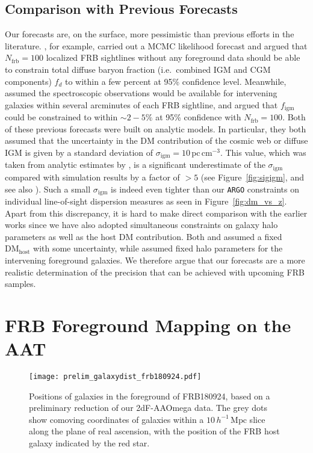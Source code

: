 \documentclass[twocolumn]{aastex63}
\newcommand{\dmhost}{\ensuremath{\mathrm{DM}_\mathrm{host}}}
\newcommand{\pccmcube}{\ensuremath{\mathrm{pc}\,\mathrm{cm}^{-3}}}
\newcommand{\sigigm}{\ensuremath{\sigma_\mathrm{igm}}}
\newcommand{\figm}{\ensuremath{f_\mathrm{igm}}}
\newcommand{\hmpc}{\ensuremath{h^{-1}\,\mathrm{Mpc}}}
\newcommand{\nfrb}{\ensuremath{N_\mathrm{frb}}}
\newcommand{\argo}{\texttt{ARGO}}
\begin{document}
\begin{CJK*}{UTF8}{gbsn}
\subsection{Comparison with Previous Forecasts}
Our forecasts are, on the surface, more pessimistic than previous efforts in the literature. \citet{walters:2019}, for example, carried out a MCMC likelihood
forecast and argued that  $\nfrb=100$ localized FRB sightlines without any foreground data should be able to constrain total diffuse
baryon fraction (i.e.\ combined IGM and CGM components) $f_d$ to within a few percent 
at 95\% confidence level. Meanwhile, \citet{ravi:2019} assumed the spectroscopic observations would be available for intervening galaxies within
several arcminutes of each FRB sightline, and argued that \figm{} could be constrained to within $\sim 2-5\%$ at 95\% confidence with $\nfrb=100$.
Both of these previous forecasts were built on analytic models. In particular, they both assumed that the uncertainty in the DM contribution of the cosmic web
or diffuse IGM is given by a standard deviation of $\sigigm=10\,\pccmcube$. 
{This value, which was taken from analytic estimates by \cite{shull:2018}},
is a significant underestimate of the \sigigm{} compared with simulation results by a factor of $>5$ (see
 Figure~\ref{fig:sigigm}, and see also \citealt{batten:2021}).
 Such a small $\sigigm$ is indeed even tighter than our \argo{} constraints
on individual line-of-sight dispersion measures as seen in Figure~\ref{fig:dm_vs_z}. 
Apart from this discrepancy, it is hard to make direct comparison with the earlier works since we have also adopted simultaneous constraints on galaxy halo parameters
as well as the host DM contribution. Both \citet{walters:2019} and \citet{ravi:2019} assumed a fixed \dmhost{} with some uncertainty, while \citet{ravi:2019}
assumed fixed halo parameters for the intervening foreground galaxies. We therefore argue that our forecasts are a more realistic determination of the precision
that can be achieved with upcoming FRB samples.

\section{FRB Foreground Mapping on the AAT}\label{sec:flimflam}

\begin{figure*}
\centering   %
\texttt{[image: prelim\_galaxydist\_frb180924.pdf]}
\caption{\label{fig:frb180924}
Positions of galaxies in the foreground of FRB180924, based on a preliminary reduction of our 2dF-AAOmega data.
The grey dots show comoving coordinates of galaxies within a $10\,\hmpc$ slice along the plane of real ascension, 
with the position of the FRB host galaxy indicated by the red star.
}
\end{figure*}


\end{CJK*}
\end{document}
